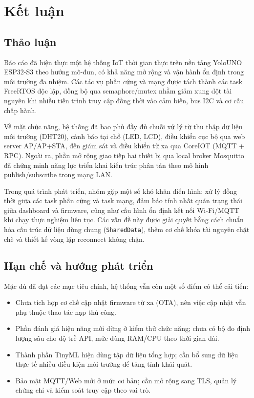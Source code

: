 ﻿\newpage
\section{Kết luận}

\subsection{Thảo luận}

Báo cáo đã hiện thực một hệ thống IoT thời gian thực trên nền tảng YoloUNO ESP32-S3 theo hướng mô-đun, có khả năng mở rộng và vận hành ổn định trong môi trường đa nhiệm. Các tác vụ phần cứng và mạng được tách thành các task FreeRTOS độc lập, đồng bộ qua semaphore/mutex nhằm giảm xung đột tài nguyên khi nhiều tiến trình truy cập đồng thời vào cảm biến, bus I2C và cơ cấu chấp hành.

Về mặt chức năng, hệ thống đã bao phủ đầy đủ chuỗi xử lý từ thu thập dữ liệu môi trường (DHT20), cảnh báo tại chỗ (LED, LCD), điều khiển cục bộ qua web server AP/AP+STA, đến giám sát và điều khiển từ xa qua CoreIOT (MQTT + RPC). Ngoài ra, phần mở rộng giao tiếp hai thiết bị qua local broker Mosquitto đã chứng minh năng lực triển khai kiến trúc phân tán theo mô hình publish/subscribe trong mạng LAN.

Trong quá trình phát triển, nhóm gặp một số khó khăn điển hình: xử lý đồng thời giữa các task phần cứng và task mạng, đảm bảo tính nhất quán trạng thái giữa dashboard và firmware, cũng như cấu hình ổn định kết nối Wi-Fi/MQTT khi chạy thực nghiệm liên tục. Các vấn đề này được giải quyết bằng cách chuẩn hóa cấu trúc dữ liệu dùng chung (\texttt{SharedData}), thêm cơ chế khóa tài nguyên chặt chẽ và thiết kế vòng lặp reconnect không chặn.

\subsection{Hạn chế và hướng phát triển}

Mặc dù đã đạt các mục tiêu chính, hệ thống vẫn còn một số điểm có thể cải tiến:
\begin{itemize}
    \item Chưa tích hợp cơ chế cập nhật firmware từ xa (OTA), nên việc cập nhật vẫn phụ thuộc thao tác nạp thủ công.
    \item Phần đánh giá hiệu năng mới dừng ở kiểm thử chức năng; chưa có bộ đo định lượng sâu cho độ trễ API, mức dùng RAM/CPU theo thời gian dài.
    \item Thành phần TinyML hiện dùng tập dữ liệu tổng hợp; cần bổ sung dữ liệu thực tế nhiều điều kiện môi trường để tăng tính khái quát.
    \item Bảo mật MQTT/Web mới ở mức cơ bản; cần mở rộng sang TLS, quản lý chứng chỉ và kiểm soát truy cập theo vai trò.
\end{itemize}

